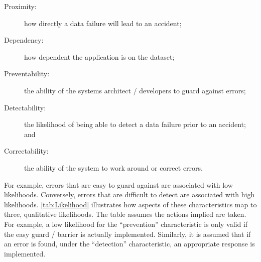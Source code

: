 \begin{description}
  \item[Proximity:] how directly a data failure will lead to an accident;
  \item[Dependency:] how dependent the application is on the \gls{dataset};
  \item[Preventability:] the ability of the systems architect / developers to guard against \glspl{error};
  \item[Detectability:] the likelihood of being able to detect a data failure prior to an accident; and
  \item[Correctability:] the ability of the system to work around or correct \glspl{error}.
\end{description}

For example, errors that are easy to guard against are associated with low likelihoods. Conversely, errors that are difficult to detect are associated with high likelihoods. \autoref {tab:Likelihood} illustrates how aspects of these characteristics map to three, qualitative likelihoods.  The table assumes the actions implied are taken. For example, a low likelihood for the ``prevention'' characteristic is only valid if the easy guard / barrier is actually implemented. Similarly, it is assumed that if an error is found, under the ``detection'' characteristic, an appropriate \gls{response} is implemented.
\clearpage
